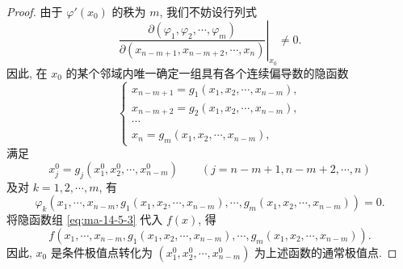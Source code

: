 \begin{proof}
由于 $\varphi'(x_0)$ 的秩为 $m$, 我们不妨设行列式
\[
  \left.
  \frac{\partial(\varphi_1,\varphi_2,\cdots,\varphi_m)}
       {\partial(x_{n-m+1},x_{n-m+2},\cdots,x_n)}
  \right|_{x_0}
  \ne0.
\]
因此, 在 $x_0$ 的某个邻域内唯一确定一组具有各个连续偏导数的隐函数
\begin{equation}
  \begin{cases}
    x_{n-m+1}=g_1(x_1,x_2,\cdots,x_{n-m}),\\
    x_{n-m+2}=g_2(x_1,x_2,\cdots,x_{n-m}),\\
    \cdots\\
    x_n=g_m(x_1,x_2,\cdots,x_{n-m}),
  \end{cases}
  \label{eq:ma-14-5-3}
\end{equation}
满足
\[
  x_j^0=g_j(x_1^0,x_2^0,\cdots,x_{n-m}^0)
  \qquad (j=n-m+1,n-m+2,\cdots,n)
\]
及对 $k=1,2,\cdots,m$, 有
\[
  \varphi_k(x_1,\cdots,x_{n-m},g_1(x_1,x_2,\cdots,x_{n-m}),\cdots,g_m(x_1,x_2,\cdots,x_{n-m}))=0.
\]
将隐函数组 \eqref{eq:ma-14-5-3} 代入 $f(x)$, 得
\[
  f(x_1,\cdots,x_{n-m},g_1(x_1,x_2,\cdots,x_{n-m}),\cdots,g_m(x_1,x_2,\cdots,x_{n-m})).
\]
因此, $x_0$ 是条件极值点转化为 $(x_1^0,x_2^0,\cdots,x_{n-m}^0)$ 为上述函数的通常极值点.


\end{proof}
